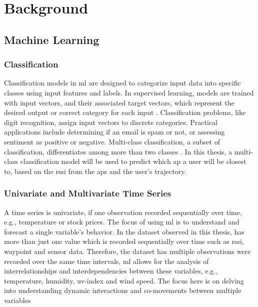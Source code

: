 \chapter{Background}\label{ch:background}

\section{Machine Learning}

\subsection{Classification}

Classification models in \ac{ml} are designed to categorize input data into specific classes using input features and labels.
In supervised learning, models are trained with input vectors, and their associated target vectors, which represent the desired output or correct category for each input \cite[p.3]{BishopPatternRecognition}.
Classification problems, like digit recognition, assign input vectors to discrete categories.
Practical applications include determining if an email is spam or not, or assessing sentiment as positive or negative.
Multi-class classification, a subset of classification, differentiates among more than two classes \cite[pp.179-182]{BishopPatternRecognition}.
In this thesis, a multi-class classification model will be used to predict which \ac{ap} a user will be closest to, based on the \ac{rssi} from the \acp{ap} and the user's trajectory.


\subsection{Univariate and Multivariate Time Series}

A time series is univariate, if one observation recorded sequentially over time, e.g., temperature or stock prices.
The focus of using \ac{ml} is to understand and forecast a single variable's behavior.
In the dataset observed in this thesis, has more than just one value which is recorded sequentially over time such as \ac{rssi}, waypoint and sensor data.  
Therefore, the dataset has multiple observations were recorded over the same time intervals, \ac{ml} allows for the analysis of interrelationships and interdependencies between these variables, e.g., temperature, humidity, uv-index and wind speed.
The focus here is on delving into understanding dynamic interactions and co-movements between multiple variables


